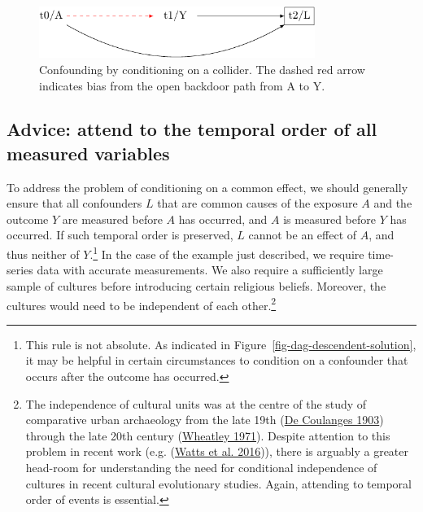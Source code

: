 \documentclass[
  singlecolumn]{report}
\begin{document}
\begin{figure}

{\centering \includegraphics[width=0.8\textwidth,height=\textheight]{causal-dags_files/figure-pdf/fig-dag-common-effect-1.pdf}

}

\caption{\label{fig-dag-common-effect}Confounding by conditioning on a
collider. The dashed red arrow indicates bias from the open backdoor
path from A to Y.}

\end{figure}

\hypertarget{advice-attend-to-the-temporal-order-of-all-measured-variables-1}{%
\subsection{Advice: attend to the temporal order of all measured
variables}\label{advice-attend-to-the-temporal-order-of-all-measured-variables-1}}

To address the problem of conditioning on a common effect, we should
generally ensure that all confounders \(L\) that are common causes of
the exposure \(A\) and the outcome \(Y\) are measured before \(A\) has
occurred, and \(A\) is measured before \(Y\) has occurred. If such
temporal order is preserved, \(L\) cannot be an effect of \(A\), and
thus neither of \(Y\).\footnote{This rule is not absolute. As indicated
  in Figure~\ref{fig-dag-descendent-solution}, it may be helpful in
  certain circumstances to condition on a confounder that occurs after
  the outcome has occurred.} In the case of the example just described,
we require time-series data with accurate measurements. We also require
a sufficiently large sample of cultures before introducing certain
religious beliefs. Moreover, the cultures would need to be independent
of each other.\footnote{The independence of cultural units was at the
  centre of the study of comparative urban archaeology from the late
  19th (\protect\hyperlink{ref-decoulanges1903}{De Coulanges 1903})
  through the late 20th century
  (\protect\hyperlink{ref-wheatley1971}{Wheatley 1971}). Despite
  attention to this problem in recent work (e.g.
  (\protect\hyperlink{ref-watts2016}{Watts et al. 2016})), there is
  arguably a greater head-room for understanding the need for
  conditional independence of cultures in recent cultural evolutionary
  studies. Again, attending to temporal order of events is essential.}
\end{document}
